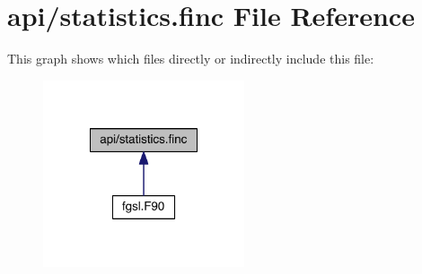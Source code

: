 \hypertarget{statistics_8finc}{\section{api/statistics.finc File Reference}
\label{statistics_8finc}
}
This graph shows which files directly or indirectly include this file\-:
\nopagebreak
\begin{figure}[H]
\begin{center}
\leavevmode
\includegraphics[width=168pt]{statistics_8finc__dep__incl}
\end{center}
\end{figure}
